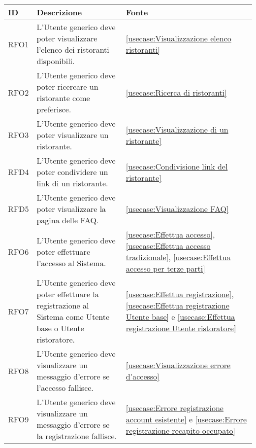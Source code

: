 \begin{table}[H]
	\renewcommand{\arraystretch}{1.5}
	\centering
	\begin{tabularx}{\textwidth}{l|X|p{2cm}}
		\textbf{ID} & \textbf{Descrizione}                                                                                                      & \textbf{Fonte} \\
		\hline
		RFO1        & L'Utente generico deve poter visualizzare l'elenco dei ristoranti disponibili.                                       & \autoref{usecase:Visualizzazione elenco ristoranti}            \\
		\hline
		RFO2        & L'Utente generico deve poter ricercare un ristorante come preferisce.                                             & \autoref{usecase:Ricerca di ristoranti}            \\
		\hline
		RFO3        & L'Utente generico deve poter visualizzare un ristorante.                                                		& \autoref{usecase:Visualizzazione di un ristorante}             \\
		\hline
		RFD4        & L'Utente generico deve poter condividere un link di un ristorante.                                                   & \autoref{usecase:Condivisione link del ristorante}            \\
		\hline
		RFD5        & L'Utente generico deve poter visualizzare la pagina delle FAQ.                 								&  \autoref{usecase:Visualizzazione FAQ}            \\
		\hline
		RFO6        & L'Utente generico deve poter effettuare l'accesso al Sistema. 												 &  \autoref{usecase:Effettua accesso}, \autoref{usecase:Effettua accesso tradizionale}, \autoref{usecase:Effettua accesso per terze parti}            \\
		\hline
		RFO7       & L'Utente generico deve poter effettuare la registrazione al Sistema come Utente base o Utente ristoratore.      &  \autoref{usecase:Effettua registrazione}, \autoref{usecase:Effettua registrazione Utente base} e \autoref{usecase:Effettua registrazione Utente ristoratore}           \\
		\hline
		RFO8        & L'Utente generico deve visualizzare un messaggio d'errore se l'accesso fallisce.                               &  \autoref{usecase:Visualizzazione errore d'accesso}             \\
		\hline
		RFO9       & L'Utente generico deve visualizzare un messaggio d'errore se la registrazione fallisce.                      &  \autoref{usecase:Errore registrazione account esistente} e \autoref{usecase:Errore registrazione recapito occupato}            \\

\end{tabularx}
\end{table}
